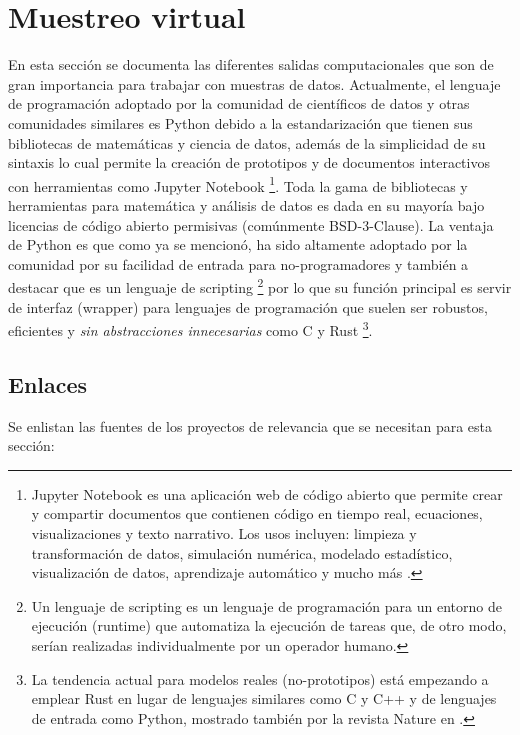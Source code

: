 \documentclass{report}
\begin{document}
\section{Muestreo virtual}

En esta sección se documenta las diferentes salidas computacionales que son de gran importancia para trabajar con muestras de datos. Actualmente, el lenguaje de programación adoptado por la comunidad de científicos de datos y otras comunidades similares es Python debido a la estandarización que tienen sus bibliotecas de matemáticas y ciencia de datos, además de la simplicidad de su sintaxis lo cual permite la creación de prototipos y de documentos interactivos con herramientas como Jupyter Notebook \footnote{Jupyter Notebook es una aplicación web de código abierto que permite crear y compartir documentos que contienen código en tiempo real, ecuaciones, visualizaciones y texto narrativo. Los usos incluyen: limpieza y transformación de datos, simulación numérica, modelado estadístico, visualización de datos, aprendizaje automático y mucho más \cite{jupyter-2021}.}. Toda la gama de bibliotecas y herramientas para matemática y análisis de datos es dada en su mayoría bajo licencias de código abierto permisivas (comúnmente BSD-3-Clause). La ventaja de Python es que como ya se mencionó, ha sido altamente adoptado por la comunidad por su facilidad de entrada para no-programadores y también a destacar que es un lenguaje de scripting \footnote{Un lenguaje de scripting es un lenguaje de programación para un entorno de ejecución (runtime) que automatiza la ejecución de tareas que, de otro modo, serían realizadas individualmente por un operador humano.} por lo que su función principal es servir de interfaz (wrapper) para lenguajes de programación que suelen ser robustos, eficientes y \textit{sin abstracciones innecesarias} como C y Rust \footnote{La tendencia actual para modelos reales (no-prototipos) está empezando a emplear Rust en lugar de lenguajes similares como C y C++ y de lenguajes de entrada como Python, mostrado también por la revista Nature en  \cite{nature-editorial-2020}.}.

\subsection{Enlaces}

Se enlistan las fuentes de los proyectos de relevancia que se necesitan para esta sección:
\end{document}

